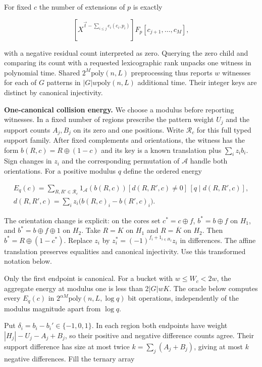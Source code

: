For fixed \(c\) the number of extensions of \(p\) is exactly

\[
\left[X^{\vec t-\sum_{i\le j}e_i(c_i,p_i)}\right]
F_p[c_{j+1},\ldots,c_M],
\tag{89}
\]

with a negative residual count interpreted as zero. Querying the zero child and comparing its count with a requested lexicographic rank unpacks one witness in polynomial time. Shared \(2^M\mathrm{poly}(n,L)\) preprocessing thus reports \(w\) witnesses for each of \(G\) patterns in \(|G|w\mathrm{poly}(n,L)\) additional time. Their integer keys are distinct by canonical injectivity.

\textbf{One-canonical collision energy.} We choose a modulus before reporting witnesses. In a fixed number of regions prescribe the pattern weight \(U_j\) and the support counts \(A_j,B_j\) on its zero and one positions. Write \(\mathcal R_c\) for this full typed support family. After fixed complements and orientations, the witness has the form \(b(R,c)=R\oplus(1-c)\) and its key is a known translation plus \(\sum_i z_i b_i\). Sign changes in \(z_i\) and the corresponding permutation of \(\mathcal A\) handle both orientations. For a positive modulus \(q\) define the ordered energy

\[
\begin{gathered}
E_q(c)=\sum_{R,R'\in\mathcal R_c}
1_{\mathcal A}(b(R,c))
[d(R,R',c)\ne0]\,[q\mid d(R,R',c)],\\
d(R,R',c)=\sum_i z_i\bigl(b(R,c)_i-b(R',c)_i\bigr).
\end{gathered}
\tag{90}
\]

The orientation change is explicit: on the cores set \(c^*=c\oplus f\), \(b^*=b\oplus f\) on \(H_1\), and \(b^*=b\oplus f\oplus1\) on \(H_2\). Take \(R=K\) on \(H_1\) and \(R=\overline K\) on \(H_2\). Then \(b^*=R\oplus(1-c^*)\). Replace \(z_i\) by \(z_i^*=(-1)^{f_i+1_{i\in H_2}}z_i\) in differences. The affine translation preserves equalities and canonical injectivity. Use this transformed notation below.

Only the first endpoint is canonical. For a bucket with \(w\le W_c<2w\), the aggregate energy at modulus one is less than \(2|G|wK\). The oracle below computes every \(E_q(c)\) in \(2^{\alpha M}\mathrm{poly}(n,L,\log q)\) bit operations, independently of the modulus magnitude apart from \(\log q\).

Put \(\delta_i=b_i-b_i'\in\{-1,0,1\}\). In each region both endpoints have weight \(|H_j|-U_j-A_j+B_j\), so their positive and negative difference counts agree. Their support difference has size at most twice \(k=\sum_j(A_j+B_j)\), giving at most \(k\) negative differences. Fill the ternary array

